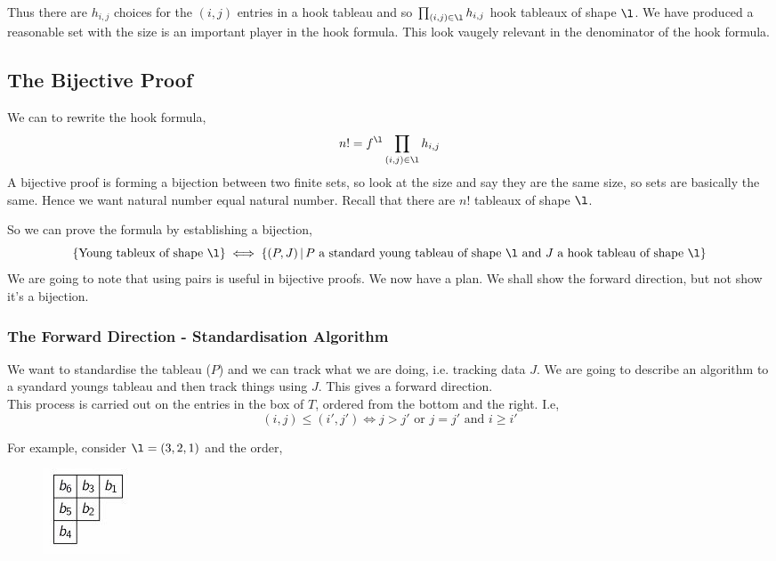 \documentclass{article}
\begin{document}
Thus there are $h_{i,j}$ choices for the $(i, j)$ entries in a hook tableau and so $\prod_{(i,j)\in \l} h_{i, j}$ hook tableaux of shape $\l$. We have produced a reasonable set with the size is an important player in the hook formula. This look vaugely relevant in the denominator of the hook formula.

\subsection{The Bijective Proof}


We can to rewrite the hook formula,
$$ n! = f^{\l}\prod_{(i,j) \in \l} h_{i,j} $$
A bijective proof is forming a bijection between two finite sets, so look at the size and say they are the same size, so sets are basically the same. Hence we want natural number equal natural number. Recall that there are $n!$ tableaux of shape $\l$.

So we can prove the formula by establishing a bijection,
$$ \{\text{Young tableux of shape $\l$}\} \iff \{(P, J)\,|\, \text{$P$ a standard young tableau of shape $\l$ and $J$ a hook tableau of shape $\l$}\} $$
We are going to note that using pairs is useful in bijective proofs. We now have a plan. We shall show the forward direction, but not show it's a bijection.\\

\subsubsection{The Forward Direction - Standardisation Algorithm}
We want to standardise the tableau ($P$) and we can track what we are doing, i.e. tracking data $J$. We are going to describe an algorithm to a syandard youngs tableau and then track things using $J$. This gives a forward direction.\\

This process is carried out on the entries in the box of $T$, ordered from the bottom and the right. I.e,
$$ (i, j) \le (i', j') \iff j > j' \text{ or } j = j' \text{ and } i \ge i' $$

For example, consider $\l = (3, 2, 1)$ and the order,
\begin{figure}[!ht]
  \centering
  \includegraphics{./figures/L3.3}
\end{figure}
\end{document}

